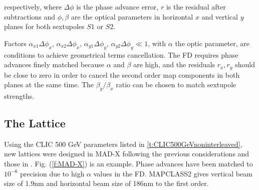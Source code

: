 respectively, where $\Delta\phi$ is the phase advance error, $r$ is the residual after subtractions and $\phi,\beta$ are the optical parameters in horizontal $x$ and vertical $y$ planes for both sextupoles $S1$ or $S2$.\par
Factors $\alpha_{x1}\Delta\phi_x$, $\alpha_{x2}\Delta\phi_x$, $\alpha_{y1}\Delta\phi_y$, $\alpha_{y2}\Delta\phi_y\ll1$, with $\alpha$ the optic parameter, are conditions to achieve geometrical terms cancellation. The FD requires phase advances finely matched because $\alpha$ and $\beta$ are high, and the residuals $r_x,r_y$ should be close to zero in order to cancel the second order map components in both planes at the same time. The $\beta_y/\beta_x$ ratio can be chosen to match sextupole strengths.\par

\subsection{The Lattice}
Using the CLIC 500 GeV parameters listed in \ref{t:CLIC500GeVnoninterleaved}, new lattices were designed in MAD-X \cite{MADX} following the previous considerations and those in \cite{Seryi-Raimondi2}. Fig. (\ref{f:MAD-X}) is an example. Phase advances have been matched to $10^{-6}$ precision due to high $\alpha$ values in the FD. MAPCLASS2 \cite{Mapclassorig,Mapclass,Mapclass2,githubMapClass2} gives vertical beam size of 1.9nm and horizontal beam size of 186nm to the first order.\par
